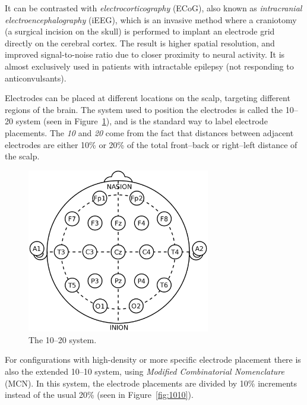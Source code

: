    It can be contrasted with \emph{electrocorticography} (ECoG), also known as \emph{intracranial electroencephalography} (iEEG), which is an invasive method where a craniotomy (a surgical incision on the skull) is performed to implant an electrode grid directly on the cerebral cortex. The result is higher spatial resolution, and improved signal-to-noise ratio due to closer proximity to neural activity. It is almost exclusively used in patients with intractable epilepsy (not responding to anticonvulsants).


    Electrodes can be placed at different locations on the scalp, targeting different regions of the brain. The system used to position the electrodes is called the 10–20 system (seen in Figure~\ref{fig:1020}), and is the standard way to label electrode placements. The \emph{10} and \emph{20} come from the fact that distances between adjacent electrodes are either 10\% or 20\% of the total front–back or right–left distance of the scalp.

    \begin{figure}[h]
        \begin{center}
            \includegraphics[width=8cm]{img/1020system.png}
        \end{center}
        \caption{The 10–20 system.}\label{fig:1020}
    \end{figure}

    For configurations with high-density or more specific electrode placement there is also the extended 10--10 system, using \emph{Modified Combinatorial Nomenclature} (MCN). In this system, the electrode placements are divided by 10\% increments instead of the usual 20\% (seen in Figure~\ref{fig:1010}).

